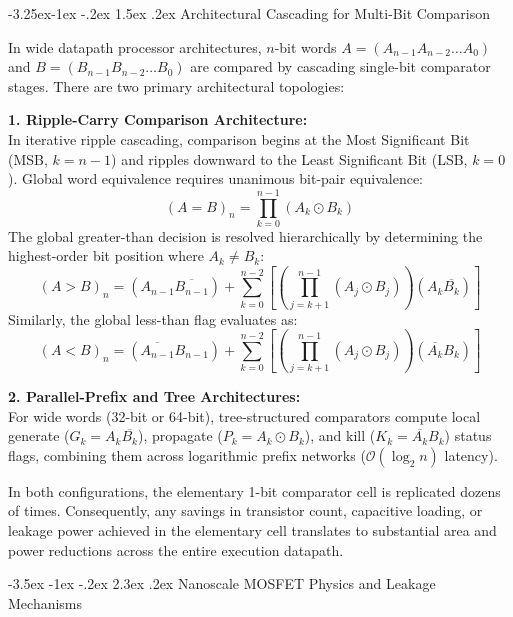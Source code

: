 \documentclass[12pt,a4paper,oneside]{report}
\makeatletter
\renewcommand\section{\@startsection {section}{1}{\z@}%
                                   {-3.5ex \@plus -1ex \@minus -.2ex}%
                                   {2.3ex \@plus.2ex}%
                                   {\normalfont\normalsize\bfseries}}
\renewcommand\subsection{\@startsection{subsection}{2}{\z@}%
                                     {-3.25ex\@plus -1ex \@minus -.2ex}%
                                     {1.5ex \@plus .2ex}%
                                     {\normalfont\normalsize\bfseries\itshape}}
\makeatother
\begin{document}
\subsection{Architectural Cascading for Multi-Bit Comparison}

In wide datapath processor architectures, $n$-bit words $A = (A_{n-1} A_{n-2} \dots A_0)$ and $B = (B_{n-1} B_{n-2} \dots B_0)$ are compared by cascading single-bit comparator stages. There are two primary architectural topologies:

\noindent\textbf{1. Ripple-Carry Comparison Architecture:}\\
In iterative ripple cascading, comparison begins at the Most Significant Bit (MSB, $k=n-1$) and ripples downward to the Least Significant Bit (LSB, $k=0$). Global word equivalence requires unanimous bit-pair equivalence:
\begin{equation}
(A = B)_n = \prod_{k=0}^{n-1} (A_k \odot B_k)
\end{equation}
The global greater-than decision is resolved hierarchically by determining the highest-order bit position where $A_k \neq B_k$:
\begin{equation}
(A > B)_n = (A_{n-1} \overline{B_{n-1}}) + \sum_{k=0}^{n-2} \left[ \left(\prod_{j=k+1}^{n-1} (A_j \odot B_j)\right) (A_k \overline{B_k}) \right]
\end{equation}
Similarly, the global less-than flag evaluates as:
\begin{equation}
(A < B)_n = (\overline{A_{n-1}} B_{n-1}) + \sum_{k=0}^{n-2} \left[ \left(\prod_{j=k+1}^{n-1} (A_j \odot B_j)\right) (\overline{A_k} B_k) \right]
\end{equation}

\noindent\textbf{2. Parallel-Prefix and Tree Architectures:}\\
For wide words (32-bit or 64-bit), tree-structured comparators compute local generate ($G_k = A_k \overline{B_k}$), propagate ($P_k = A_k \odot B_k$), and kill ($K_k = \overline{A_k} B_k$) status flags, combining them across logarithmic prefix networks ($\mathcal{O}(\log_2 n)$ latency).

In both configurations, the elementary 1-bit comparator cell is replicated dozens of times. Consequently, any savings in transistor count, capacitive loading, or leakage power achieved in the elementary cell translates to substantial area and power reductions across the entire execution datapath.

\section{Nanoscale MOSFET Physics and Leakage Mechanisms}
\end{document}
